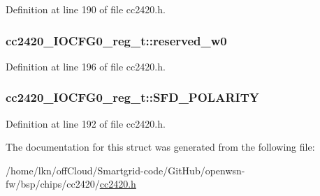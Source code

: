 Definition at line 190 of file cc2420.\+h.

\subsubsection[{\texorpdfstring{reserved\+\_\+w0}{reserved_w0}}]{ cc2420\+\_\+\+I\+O\+C\+F\+G0\+\_\+reg\+\_\+t\+::reserved\+\_\+w0}\hypertarget{structcc2420___i_o_c_f_g0__reg__t_afa9bbbe9ad2f56affcf9e80cb8f1fad9}{}\label{structcc2420___i_o_c_f_g0__reg__t_afa9bbbe9ad2f56affcf9e80cb8f1fad9}


Definition at line 196 of file cc2420.\+h.

\subsubsection[{\texorpdfstring{S\+F\+D\+\_\+\+P\+O\+L\+A\+R\+I\+TY}{SFD_POLARITY}}]{ cc2420\+\_\+\+I\+O\+C\+F\+G0\+\_\+reg\+\_\+t\+::\+S\+F\+D\+\_\+\+P\+O\+L\+A\+R\+I\+TY}\hypertarget{structcc2420___i_o_c_f_g0__reg__t_a93edbb9864379f04febd71ce3c92d137}{}\label{structcc2420___i_o_c_f_g0__reg__t_a93edbb9864379f04febd71ce3c92d137}


Definition at line 192 of file cc2420.\+h.



The documentation for this struct was generated from the following file\+:\begin{DoxyCompactItemize}
\item 
/home/lkn/off\+Cloud/\+Smartgrid-\/code/\+Git\+Hub/openwsn-\/fw/bsp/chips/cc2420/\hyperlink{cc2420_8h}{cc2420.\+h}\end{DoxyCompactItemize}
